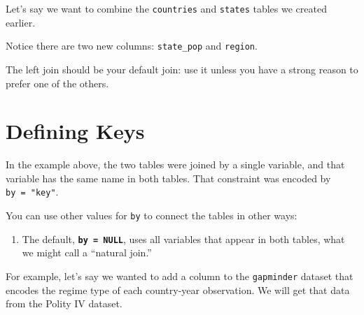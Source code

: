 \documentclass[
]{book}
\newenvironment{Shaded}{\begin{snugshade}}{\end{snugshade}}
\newcommand{\CommentTok}[1]{\textcolor[rgb]{0.56,0.35,0.01}{\textit{#1}}}
\newcommand{\DataTypeTok}[1]{\textcolor[rgb]{0.13,0.29,0.53}{#1}}
\newcommand{\KeywordTok}[1]{\textcolor[rgb]{0.13,0.29,0.53}{\textbf{#1}}}
\newcommand{\NormalTok}[1]{#1}
\newcommand{\OperatorTok}[1]{\textcolor[rgb]{0.81,0.36,0.00}{\textbf{#1}}}
\newcommand{\StringTok}[1]{\textcolor[rgb]{0.31,0.60,0.02}{#1}}
\providecommand{\tightlist}{%
  \setlength{\itemsep}{0pt}\setlength{\parskip}{0pt}}
\begin{document}
Let's say we want to combine the \texttt{countries} and \texttt{states} tables we created earlier.

\begin{Shaded}
\end{Shaded}

Notice there are two new columns: \texttt{state\_pop} and \texttt{region}.

The left join should be your default join: use it unless you have a strong reason to prefer one of the others.

\hypertarget{defining-keys}{%
\section{Defining Keys}\label{defining-keys}}

In the example above, the two tables were joined by a single variable, and that variable has the same name in both tables. That constraint was encoded by \texttt{by\ =\ "key"}.

You can use other values for \texttt{by} to connect the tables in other ways:

\begin{enumerate}
\def\labelenumi{\arabic{enumi}.}
\tightlist
\item
  The default, \textbf{\texttt{by\ =\ NULL}}, uses all variables that appear in both tables, what we might call a ``natural join.''
\end{enumerate}

For example, let's say we wanted to add a column to the \texttt{gapminder} dataset that encodes the regime type of each country-year observation. We will get that data from the Polity IV dataset.
\end{document}
